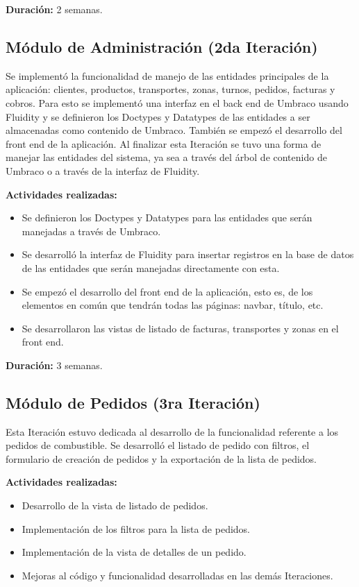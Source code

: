 \textbf{Duración:} 2 semanas.

\subsection{Módulo de Administración (2da Iteración)}
Se implementó la funcionalidad de manejo de las entidades principales de la aplicación: clientes, productos, transportes, zonas, turnos, pedidos, facturas y cobros. Para esto se implementó una interfaz en el back end de Umbraco usando Fluidity y se definieron los Doctypes y Datatypes de las entidades a ser almacenadas como contenido de Umbraco. También se empezó el desarrollo del front end de la aplicación. Al finalizar esta Iteración se tuvo una forma de manejar las entidades del sistema, ya sea a través del árbol de contenido de Umbraco o a través de la interfaz de Fluidity.

\textbf{Actividades realizadas:}
\begin{itemize}
    \item Se definieron los Doctypes y Datatypes para las entidades que serán manejadas a través de Umbraco.
    \item Se desarrolló la interfaz de Fluidity para insertar registros en la base de datos de las entidades que serán manejadas directamente con esta.
    \item Se empezó el desarrollo del front end de la aplicación, esto es, de los elementos en común que tendrán todas las páginas: navbar, título, etc.
    \item Se desarrollaron las vistas de listado de facturas, transportes y zonas en el front end.
\end{itemize}

\textbf{Duración:} 3 semanas.

\subsection{Módulo de Pedidos (3ra Iteración)}
Esta Iteración estuvo dedicada al desarrollo de la funcionalidad referente a los pedidos de combustible. Se desarrolló el listado de pedido con filtros, el formulario de creación de pedidos y la exportación de la lista de pedidos.

\textbf{Actividades realizadas:}
\begin{itemize}
    \item Desarrollo de la vista de listado de pedidos.
    \item Implementación de los filtros para la lista de pedidos.
    \item Implementación de la vista de detalles de un pedido.
    \item Mejoras al código y funcionalidad desarrolladas en las demás Iteraciones.
\end{itemize}


